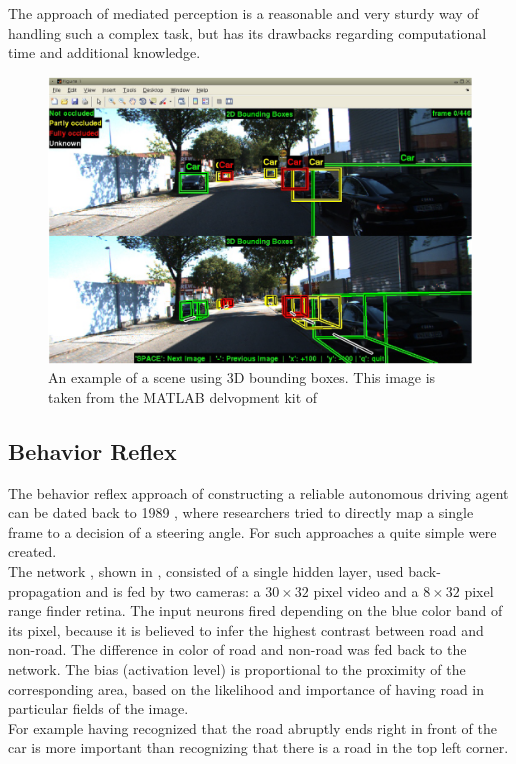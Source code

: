 The approach of mediated perception is a reasonable and very sturdy way of handling such a complex task, but has its drawbacks regarding computational time and additional knowledge.

\begin{figure}
	\centering
	\includegraphics[scale=0.4]{src/pic/3D-boundingbox-example.png}
	\caption{An example of a scene using 3D bounding boxes. This image is taken from the MATLAB delvopment kit of \cite{KITTI}}
	\label{pic: 3D Bounding Box}
\end{figure}

\subsection{Behavior Reflex}\label{subsec: Behavior Reflex}

The behavior reflex approach of constructing a reliable autonomous driving agent can be dated back to 1989 , where researchers tried to directly map a single frame to a decision of a steering angle. For such approaches a quite simple \nn were created. \\
The network \alvinn, shown in , consisted of a single hidden layer, used back-propagation and is fed by two cameras: a $30\times32$ pixel video and a $8\times32$ pixel range finder retina. The input neurons fired depending on the blue color band of its pixel, because it is believed to infer the highest contrast between road and non-road. The difference in color of road and non-road was fed back to the network. The bias (activation level) is proportional to the proximity of the corresponding area, based on the likelihood and importance of having road in particular fields of the image.\cite{pomerleau1989alvinn}\\
For example having recognized that the road abruptly ends right in front of the car is more important than recognizing that there is a road in the top left corner.\\

